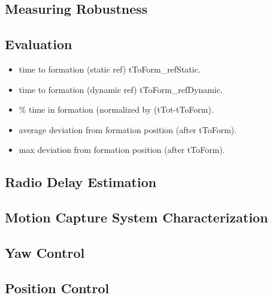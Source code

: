 \documentclass[a4paper, 12pt]{report}
\begin{document}
\subsection{Measuring Robustness}

\subsection{Evaluation}
\begin{itemize}
\item time to formation (static ref) tToForm\_refStatic.
\item time to formation (dynamic ref) tToForm\_refDynamic.
\item \% time in formation (normalized by (tTot-tToForm).
\item average deviation from formation position (after tToForm).
\item max deviation from formation position (after tToForm).

\end{itemize}

\cite{Arkin1999}
\cite{Mataric2002}

\subsection{Radio Delay Estimation}
\subsection{Motion Capture System Characterization}
\subsection{Yaw Control}
\subsection{Position Control}
\end{document}

